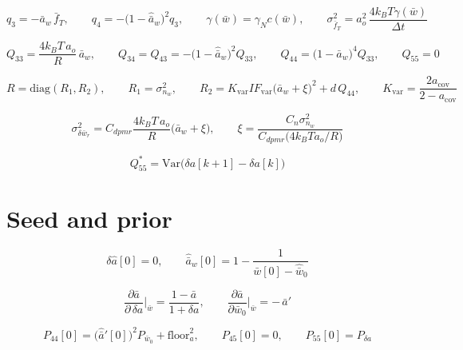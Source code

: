 \documentclass[11pt,a4paper,fontset=none]{ctexart}
\newcommand{\ba}{\bar{a}}
\newcommand{\bw}{\bar{w}}
\begin{document}
\begin{equation*}
q_3 = -\ba_w\,\bar{f}_T,
\qquad
q_4 = -\bigl(1-\hat{\ba}_w\bigr)^{2}q_3,
\qquad
\gamma(\bw) = \gamma_N c(\bw),
\qquad
\sigma^{2}_{\bar{f}_T} = a_o^{2}\,\frac{4k_BT\gamma(\bw)}{\Delta t}
\end{equation*}

\begin{equation*}
Q_{33} = \frac{4k_BT\,a_o}{R}\,\ba_w,
\qquad
Q_{34} = Q_{43} = -\bigl(1-\hat{\ba}_w\bigr)^{2}Q_{33},
\qquad
Q_{44} = \bigl(1-\hat{\ba}_w\bigr)^{4}Q_{33},
\qquad
Q_{55} = 0
\end{equation*}

\begin{equation*}
R = \mathrm{diag}(R_1, R_2),
\qquad
R_1 = \sigma^{2}_{n_w},
\qquad
R_2 = K_{\mathrm{var}} IF_{\mathrm{var}}\bigl(\ba_w+\xi\bigr)^{2} + d\,Q_{44},
\qquad
K_{\mathrm{var}} = \frac{2a_{\mathrm{cov}}}{2-a_{\mathrm{cov}}}
\end{equation*}

\begin{equation*}
\sigma^{2}_{\delta\bw_r} = C_{dpmr}\frac{4k_BT\,a_o}{R}\bigl(\ba_w+\xi\bigr),
\qquad
\xi = \frac{C_n\sigma^{2}_{n_w}}{C_{dpmr}\bigl(4k_BT a_o/R\bigr)}
\end{equation*}

\begin{equation*}
Q_{55}^{\ast} = \mathrm{Var}\bigl(\delta a[k+1] - \delta a[k]\bigr)
\end{equation*}

\section*{Seed and prior}

\begin{equation*}
\delta\hat{a}[0] = 0,
\qquad
\hat{\ba}_w[0] = 1 - \frac{1}{\bw[0]-\hat{\bw}_0}
\end{equation*}

\begin{equation*}
\frac{\partial\ba}{\partial\,\delta a}\bigg|_{\bw} = \frac{1-\ba}{1+\delta a},
\qquad
\frac{\partial\ba}{\partial\bw_0}\bigg|_{\bw} = -\,\ba'
\end{equation*}

\begin{equation*}
P_{44}[0] = \bigl(\hat{\ba}'[0]\bigr)^{2} P_{\bw_0} + \mathrm{floor}_a^{2},
\qquad
P_{45}[0] = 0,
\qquad
P_{55}[0] = P_{\delta a}
\end{equation*}
\end{document}
